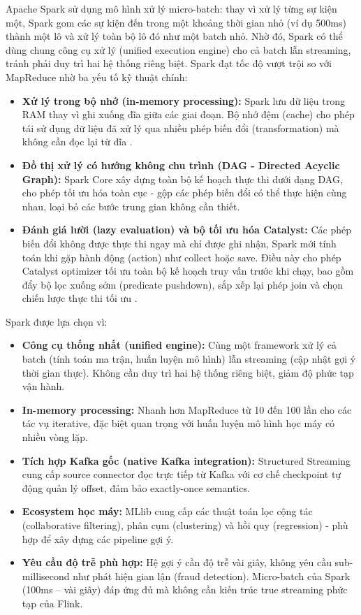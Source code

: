 \documentclass[../BTL.tex]{subfiles}
\begin{document}
Apache Spark sử dụng mô hình xử lý micro-batch: thay vì xử lý từng sự kiện một, Spark gom các sự kiện đến trong một khoảng thời gian nhỏ (ví dụ 500ms) thành một lô và xử lý toàn bộ lô đó như một batch nhỏ. Nhờ đó, Spark có thể dùng chung công cụ xử lý (unified execution engine) cho cả batch lẫn streaming, tránh phải duy trì hai hệ thống riêng biệt. Spark đạt tốc độ vượt trội so với MapReduce nhờ ba yếu tố kỹ thuật chính:

\begin{itemize}
    \item \textbf{Xử lý trong bộ nhớ (in-memory processing):} Spark lưu dữ liệu trong RAM thay vì ghi xuống đĩa giữa các giai đoạn. Bộ nhớ đệm (cache) cho phép tái sử dụng dữ liệu đã xử lý qua nhiều phép biến đổi (transformation) mà không cần đọc lại từ đĩa \cite{spark_rdd}.
    \item \textbf{Đồ thị xử lý có hướng không chu trình (DAG - Directed Acyclic Graph):} Spark Core xây dựng toàn bộ kế hoạch thực thi dưới dạng DAG, cho phép tối ưu hóa toàn cục - gộp các phép biến đổi có thể thực hiện cùng nhau, loại bỏ các bước trung gian không cần thiết.
    \item \textbf{Đánh giá lười (lazy evaluation) và bộ tối ưu hóa Catalyst:} Các phép biến đổi không được thực thi ngay mà chỉ được ghi nhận, Spark mới tính toán khi gặp hành động (action) như collect hoặc save. Điều này cho phép Catalyst optimizer tối ưu toàn bộ kế hoạch truy vấn trước khi chạy, bao gồm đẩy bộ lọc xuống sớm (predicate pushdown), sắp xếp lại phép join và chọn chiến lược thực thi tối ưu \cite{spark_sql}.
\end{itemize}

Spark được lựa chọn vì:
\begin{itemize}
    \item \textbf{Công cụ thống nhất (unified engine):} Cùng một framework xử lý cả batch (tính toán ma trận, huấn luyện mô hình) lẫn streaming (cập nhật gợi ý thời gian thực). Không cần duy trì hai hệ thống riêng biệt, giảm độ phức tạp vận hành.
    \item \textbf{In-memory processing:} Nhanh hơn MapReduce từ 10 đến 100 lần cho các tác vụ iterative, đặc biệt quan trọng với huấn luyện mô hình học máy có nhiều vòng lặp.
    \item \textbf{Tích hợp Kafka gốc (native Kafka integration):} Structured Streaming cung cấp source connector đọc trực tiếp từ Kafka với cơ chế checkpoint tự động quản lý offset, đảm bảo exactly-once semantics.
    \item \textbf{Ecosystem học máy:} MLlib cung cấp các thuật toán lọc cộng tác (collaborative filtering), phân cụm (clustering) và hồi quy (regression) - phù hợp để xây dựng các pipeline gợi ý.
    \item \textbf{Yêu cầu độ trễ phù hợp:} Hệ gợi ý cần độ trễ vài giây, không yêu cầu sub-millisecond như phát hiện gian lận (fraud detection). Micro-batch của Spark (100ms – vài giây) đáp ứng đủ mà không cần kiến trúc true streaming phức tạp của Flink.
\end{itemize}
\end{document}
